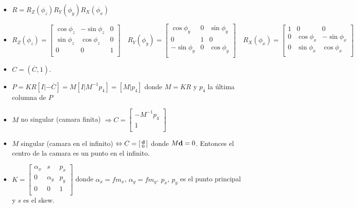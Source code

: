 \documentclass[12pt,a4paper]{article}
\begin{document}
\begin{itemize}

	\item $R = R_{Z}(\phi_{z})R_{Y}(\phi_{y})R_{X}(\phi_{x})$

\item $
	R_{Z}(\phi_{z}) =
	\left[ {\begin{smallmatrix}
	 \cos{\phi_{z}} & -\sin{\phi_{z}} & 0 \\
	 \sin{\phi_{z}} & \cos{\phi_{z}} & 0 \\
	 0 & 0 & 1\\
	\end{smallmatrix} } \right] \quad R_{Y}(\phi_{y}) =
	\left[ {\begin{smallmatrix}
		\cos{\phi_{y}} & 0 & \sin{\phi_{y}}\\
		 0 & 1 & 0\\
	    -\sin{\phi_{y}} & 0 & \cos{\phi_{y}}\\
	\end{smallmatrix} } \right] \quad R_{X}(\phi_{x}) =
	\left[ {\begin{smallmatrix}
		1 & 0 & 0\\ 
	    0 & \cos{\phi_{x}} & -\sin{\phi_{x}}\\
	    0 & \sin{\phi_{x}} & \cos{\phi_{x}}\\
	\end{smallmatrix} } \right]
	$

	\item $C = (\overline{C}, 1)$.

	\item $P = KR [I |- \overline{C}] = M[I|M^{-1}p_{4}] = [M|p_{4}]$ donde $M= KR$ y $p_{4}$ la \'ultima columna de $P$

	\item $M$ no singular (camara finita) $\Rightarrow C = \left[ {\begin{smallmatrix}
		-M^{-1}p_{4}\\ 
		 1\\
	\end{smallmatrix} } \right]$ 

	\item $M$ singular (camara en el infinito) $\Leftrightarrow C = \left[ {\begin{smallmatrix}
		{\bf d}\\ 
		0\\
	\end{smallmatrix} } \right]$ donde $M {\bf d} = 0$. Entonces el centro de la camara es un punto en el infinito.

	\item $
	K = \left[ {\begin{smallmatrix}
		\alpha_{x} & s & p_{x}\\ 
	    0 & \alpha_{y} & p_{y}\\
	    0 & 0 & 1\\
	\end{smallmatrix} } \right]
	$ donde $\alpha_{x} = f m_{x}$, $\alpha_{y} = f m_{y}$. $p_{x}$, $p_{y}$ es el punto principal y $s$ es el skew.

\end{itemize}
\end{document}

